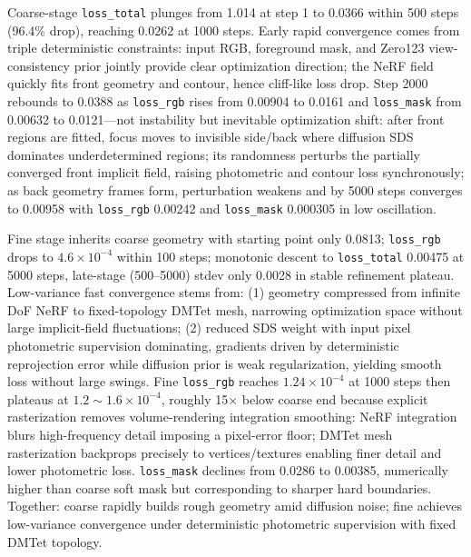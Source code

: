 \documentclass[10pt,twocolumn,letterpaper]{article}
\begin{document}
Coarse-stage \texttt{loss\_total} plunges from 1.014 at step 1 to 0.0366 within 500 steps (96.4\% drop), reaching 0.0262 at 1000 steps. Early rapid convergence comes from triple deterministic constraints: input RGB, foreground mask, and Zero123 view-consistency prior jointly provide clear optimization direction; the NeRF field quickly fits front geometry and contour, hence cliff-like loss drop. Step 2000 rebounds to 0.0388 as \texttt{loss\_rgb} rises from 0.00904 to 0.0161 and \texttt{loss\_mask} from 0.00632 to 0.0121---not instability but inevitable optimization shift: after front regions are fitted, focus moves to invisible side/back where diffusion SDS dominates underdetermined regions; its randomness perturbs the partially converged front implicit field, raising photometric and contour loss synchronously; as back geometry frames form, perturbation weakens and by 5000 steps converges to 0.00958 with \texttt{loss\_rgb} 0.00242 and \texttt{loss\_mask} 0.000305 in low oscillation.

Fine stage inherits coarse geometry with starting point only 0.0813; \texttt{loss\_rgb} drops to $4.6{\times}10^{-4}$ within 100 steps; monotonic descent to \texttt{loss\_total} 0.00475 at 5000 steps, late-stage (500--5000) stdev only 0.0028 in stable refinement plateau. Low-variance fast convergence stems from: (1) geometry compressed from infinite DoF NeRF to fixed-topology DMTet mesh, narrowing optimization space without large implicit-field fluctuations; (2) reduced SDS weight with input pixel photometric supervision dominating, gradients driven by deterministic reprojection error while diffusion prior is weak regularization, yielding smooth loss without large swings. Fine \texttt{loss\_rgb} reaches $1.24{\times}10^{-4}$ at 1000 steps then plateaus at $1.2{\sim}1.6{\times}10^{-4}$, roughly 15$\times$ below coarse end because explicit rasterization removes volume-rendering integration smoothing: NeRF integration blurs high-frequency detail imposing a pixel-error floor; DMTet mesh rasterization backprops precisely to vertices/textures enabling finer detail and lower photometric loss. \texttt{loss\_mask} declines from 0.0286 to 0.00385, numerically higher than coarse soft mask but corresponding to sharper hard boundaries. Together: coarse rapidly builds rough geometry amid diffusion noise; fine achieves low-variance convergence under deterministic photometric supervision with fixed DMTet topology.
\end{document}
